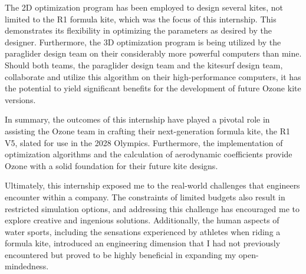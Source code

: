 The 2D optimization program has been employed to design several kites, not limited to the R1 formula kite, which was the focus of this internship. This demonstrates its flexibility in optimizing the parameters as desired by the designer. Furthermore, the 3D optimization program is being utilized by the paraglider design team on their considerably more powerful computers than mine. Should both teams, the paraglider design team and the kitesurf design team, collaborate and utilize this algorithm on their high-performance computers, it has the potential to yield significant benefits for the development of future Ozone kite versions.

In summary, the outcomes of this internship have played a pivotal role in assisting the Ozone team in crafting their next-generation formula kite, the R1 V5, slated for use in the 2028 Olympics. Furthermore, the implementation of optimization algorithms and the calculation of aerodynamic coefficients provide Ozone with a solid foundation for their future kite designs. 

Ultimately, this internship exposed me to the real-world challenges that engineers encounter within a company. The constraints of limited budgets also result in restricted simulation options, and addressing this challenge has encouraged me to explore creative and ingenious solutions. Additionally, the human aspects of water sports, including the sensations experienced by athletes when riding a formula kite, introduced an engineering dimension that I had not previously encountered but proved to be highly beneficial in expanding my open-mindedness.

